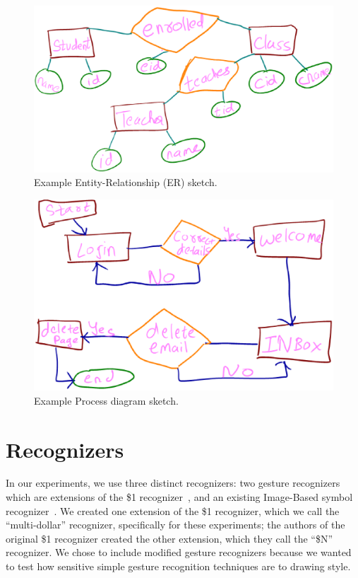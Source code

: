 \documentclass[final,5p,twocolumn]{elsarticle}
\begin{document}
\begin{figure}
\begin{center}
\includegraphics[width=.95\hsize]{ER.eps}
\end{center}
\caption{Example Entity-Relationship (ER) sketch.}
\label{fig:ER}
\end{figure}
\begin{figure}
\begin{center}
\includegraphics[width=.95\hsize]{Process.eps}
\end{center}
\caption{Example Process diagram sketch.}
\label{fig:Process}
\end{figure}

\section{Recognizers}
In our experiments, we use three distinct recognizers: two gesture
recognizers which are extensions of the \$1 recognizer~\cite{wobbrock07}, and an
existing Image-Based symbol recognizer~\cite{kara05}.
We created one extension of the \$1 recognizer, which we call
the ``multi-dollar'' recognizer, specifically for these experiments;
the authors of the original \$1 recognizer created the other extension, which they
call the ``\$N'' recognizer.  We chose to include
modified gesture recognizers because we wanted to test how sensitive
simple gesture recognition techniques are to drawing style.
\end{document}
